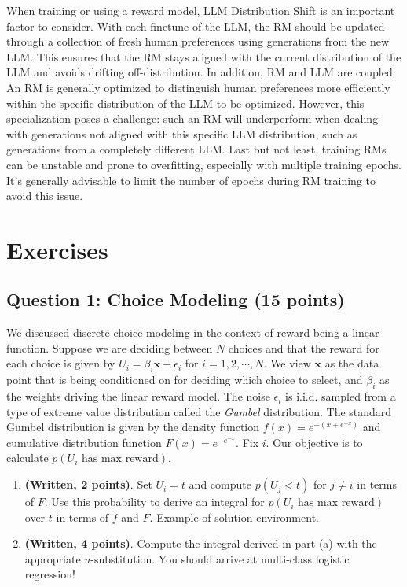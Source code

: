 \documentclass[
  letterpaper,
  numbers=noenddot,
  DIV=11]{scrreprt}
\theoremstyle{definition}
\theoremstyle{plain}
\theoremstyle{plain}
\theoremstyle{remark}
\begin{document}
When training or using a reward model, LLM Distribution Shift is an
important factor to consider. With each finetune of the LLM, the RM
should be updated through a collection of fresh human preferences using
generations from the new LLM. This ensures that the RM stays aligned
with the current distribution of the LLM and avoids drifting
off-distribution. In addition, RM and LLM are coupled: An RM is
generally optimized to distinguish human preferences more efficiently
within the specific distribution of the LLM to be optimized. However,
this specialization poses a challenge: such an RM will underperform when
dealing with generations not aligned with this specific LLM
distribution, such as generations from a completely different LLM. Last
but not least, training RMs can be unstable and prone to overfitting,
especially with multiple training epochs. It's generally advisable to
limit the number of epochs during RM training to avoid this issue.

\section{Exercises}\label{exercises}

\subsection*{Question 1: Choice Modeling (15
points)}\label{question-1-choice-modeling-15-points}

We discussed discrete choice modeling in the context of reward being a
linear function. Suppose we are deciding between \(N\) choices and that
the reward for each choice is given by
\(U_i=\beta_i\mathbf{x}+\epsilon_i\) for \(i=1, 2, \cdots, N\). We view
\(\mathbf{x}\) as the data point that is being conditioned on for
deciding which choice to select, and \(\beta_i\) as the weights driving
the linear reward model. The noise \(\epsilon_i\) is i.i.d. sampled from
a type of extreme value distribution called the \emph{Gumbel}
distribution. The standard Gumbel distribution is given by the density
function \(f(x)=e^{-(x+e^{-x})}\) and cumulative distribution function
\(F(x)=e^{-e^{-x}}.\) Fix \(i\). Our objective is to calculate
\(p(U_i\,\, \text{has max reward})\).

\begin{enumerate}
\def\labelenumi{(\alph{enumi})}
\item
  \textbf{(Written, 2 points)}. Set \(U_i=t\) and compute \(p(U_j<t)\)
  for \(j\neq i\) in terms of \(F\). Use this probability to derive an
  integral for \(p(U_i\,\,  \text{has max reward})\) over \(t\) in terms
  of \(f\) and \(F\). Example of solution environment.
\item
  \textbf{(Written, 4 points)}. Compute the integral derived in part (a)
  with the appropriate \(u\)-substitution. You should arrive at
  multi-class logistic regression!
\end{enumerate}
\end{document}
